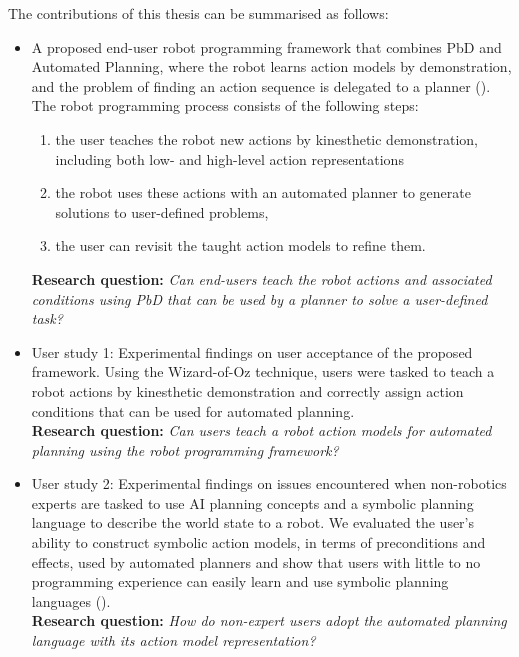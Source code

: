The contributions of this thesis can be summarised as follows:
\begin{itemize}
	\item {A proposed end-user robot programming framework that combines PbD and Automated Planning, where the robot learns action models by demonstration, and the problem of finding an action sequence is delegated to a planner (\cite{liang2017framework}).
	The robot programming process consists of the following steps:
	\begin{enumerate}
		\item the user teaches the robot new actions by kinesthetic demonstration, including both low- and high-level action representations
		\item the robot uses these actions with an automated planner to generate solutions to user-defined problems,
		\item the user can revisit the taught action models to refine them.
	\end{enumerate}
	\textbf{Research question:} \textit{Can end-users teach the robot actions and associated conditions using PbD that can be used by a planner to solve a user-defined task?}}

    \item {User study 1: Experimental findings on user acceptance of the proposed framework. Using the Wizard-of-Oz technique, users were tasked to teach a robot actions by kinesthetic demonstration and correctly assign action conditions that can be used for automated planning.\\
    \textbf{Research question:} \textit{Can users teach a robot action models for automated planning using the robot programming framework?}}

    \item {User study 2: Experimental findings on issues encountered when non-robotics experts are tasked to use AI planning concepts and a symbolic planning language to describe the world state to a robot. 
    We evaluated the user's ability to construct symbolic action models, in terms of preconditions and effects, used by automated planners and show that users with little to no programming experience can easily learn and use symbolic planning languages (\cite{liang2017evaluation}).\\
    \textbf{Research question:} \textit{How do non-expert users adopt the automated planning language with its action model representation?}}


\end{itemize}
